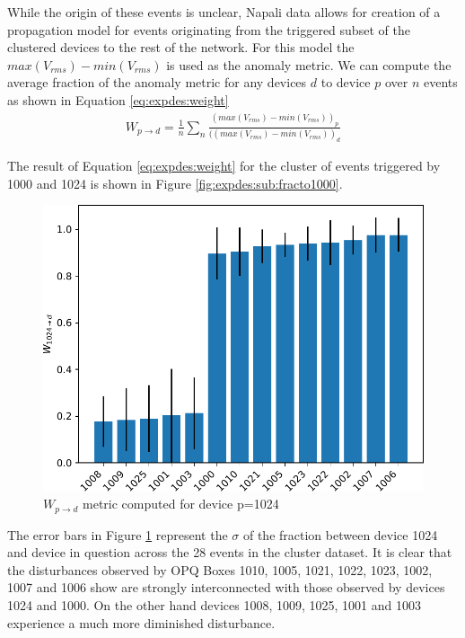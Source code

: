 While the origin of these events is unclear, Napali data allows for creation of a propagation model for events originating from the triggered subset of the clustered devices to the rest of the network.
For this model the $max(V_{rms}) - min(V_{rms})$ is used as the anomaly metric.
We can compute the average fraction of the anomaly metric for any devices $d$ to device $p$ over $n$ events as shown in Equation \ref{eq:expdes:weight}
\begin{equation} \label{eq:expdes:weight}
\begin{aligned}
    W_{p \rightarrow d} = \frac{1}{n}\sum_{n}\frac{(max(V_{rms}) - min(V_{rms}))_{p}}{((max(V_{rms}) - min(V_{rms}))_{d}}
\end{aligned}
\end{equation}

The result of Equation \ref{eq:expdes:weight} for the cluster of events triggered by 1000 and 1024 is shown in Figure \ref{fig:expdes:sub:fracto1000}.
\begin{figure}[ht!]
    \centering
        \includegraphics[width=0.8\linewidth]{img/napali_eval/subthreshold/clustering/1024toall.pdf}
    \caption{$W_{p \rightarrow d}$ metric computed for device p=1024}
    \label{fig:expdes:sub:fracto1024}
\end{figure}

The error bars in Figure \ref{fig:expdes:sub:fracto1024} represent the $\sigma$ of the fraction between device 1024 and device in question across the 28 events in the cluster dataset.
It is clear that the disturbances observed by OPQ Boxes 1010, 1005, 1021, 1022, 1023, 1002, 1007 and 1006 show are strongly interconnected with those observed by devices 1024 and 1000.
On the other hand devices 1008, 1009, 1025, 1001 and 1003 experience a much more diminished disturbance.

